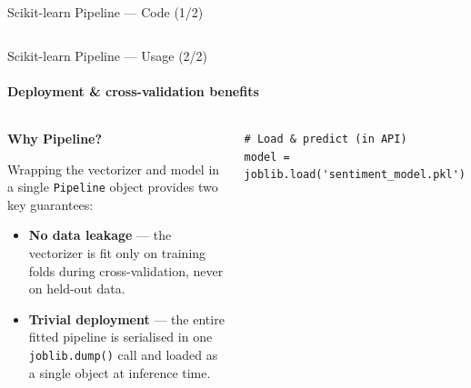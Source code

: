\documentclass[aspectratio=169,10pt]{beamer}
\begin{document}
\begin{frame}[fragile]{Scikit-learn Pipeline --- Code (1/2)}
\begin{columns}[T]
\end{columns}
\end{frame}


\begin{frame}[fragile]{Scikit-learn Pipeline --- Usage (2/2)}
\framesubtitle{Deployment \& cross-validation benefits}

\begin{columns}[T]
  \vspace{-0.2cm}

  \begin{tcolorbox}[enhanced,colback=pgreenlt,colframe=pgreen,
      boxrule=0pt,leftrule=4pt,arc=3pt,
      top=8pt,bottom=8pt,left=8pt,right=8pt]
    \small\textbf{Why Pipeline?}

    \vspace{4pt}
    \small Wrapping the vectorizer and model in a single
    \texttt{Pipeline} object provides two key guarantees:

    \vspace{6pt}
    \begin{itemize}\setlength\itemsep{4pt}
      \item \textbf{No data leakage} --- the vectorizer is
            fit only on training folds during cross-validation,
            never on held-out data.
      \item \textbf{Trivial deployment} --- the entire
            fitted pipeline is serialised in one
            \texttt{joblib.dump()} call and loaded as a
            single object at inference time.
    \end{itemize}
  \end{tcolorbox}

  \vspace{-0.2cm}

  \begin{tcolorbox}[codebox]
  \begin{lstlisting}[style=py, numbers=none]
# Load & predict (in API)
model = joblib.load('sentiment_model.pkl')


\end{lstlisting}
\end{tcolorbox}
\end{columns}
\end{frame}
\end{document}
